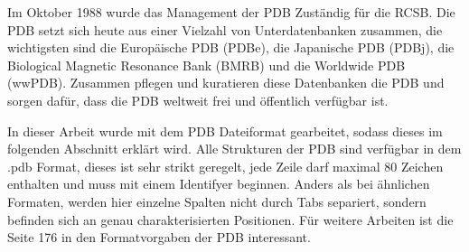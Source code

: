 
Im Oktober 1988 wurde das Management der \ac{PDB} Zuständig für die \ac{RCSB}. Die \ac{PDB} setzt sich heute aus einer Vielzahl von Unterdatenbanken zusammen, die wichtigsten sind die Europäische \ac{PDB} (PDBe), die Japanische \ac{PDB} (PDBj), die Biological Magnetic Resonance Bank (BMRB) und die Worldwide \ac{PDB} (wwPDB). Zusammen pflegen und kuratieren diese Datenbanken die \ac{PDB} und sorgen dafür, dass die \ac{PDB} weltweit frei und öffentlich verfügbar ist.


In dieser Arbeit wurde mit dem \ac{PDB} Dateiformat gearbeitet, sodass dieses im folgenden Abschnitt erklärt wird. Alle Strukturen der \ac{PDB} sind verfügbar in dem .pdb Format, dieses ist sehr strikt geregelt, jede Zeile darf maximal 80 Zeichen enthalten und muss mit einem Identifyer beginnen. Anders als bei ähnlichen Formaten, werden hier einzelne Spalten nicht durch Tabs separiert, sondern befinden sich an genau charakterisierten Positionen. 
Für weitere Arbeiten ist die Seite 176 in den Formatvorgaben der \ac{PDB} interessant.


